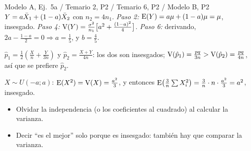 \begin{modelo}{Modelo A, Ej.\ 5a / Temario 2, P2 / Temario 6, P2 / Modelo B, P2}
$Y=a\bar{X}_1+(1-a)\bar{X}_2$ con $n_2=4n_1$. \emph{Paso 2:} $\mathrm{E}(Y)=a\mu+(1-a)\mu=\mu$, insesgado.
\emph{Paso 4:} $\mathrm{V}(Y)=\frac{\sigma^2}{n_1}\big[a^2+\frac{(1-a)^2}{4}\big]$.
\emph{Paso 6:} derivando, $2a-\frac{1-a}{2}=0\Rightarrow a=\frac15$, y $b=\frac45$.

$\hat p_1=\frac12(\frac Xn+\frac Y{3n})$ y $\hat p_2=\frac{X+Y}{4n}$: los dos son insesgados; $\mathrm{V}(\hat p_1)=\frac{pq}{3n}>\mathrm{V}(\hat p_2)=\frac{pq}{4n}$, así que se prefiere $\hat p_2$.

$X\sim U(-a;a)$: $\mathrm{E}(X^2)=\mathrm{V}(X)=\frac{a^2}3$, y entonces $\mathrm{E}\big(\frac3n\sum X_i^2\big)=\frac3n\cdot n\cdot\frac{a^2}{3}=a^2$, insesgado.
\end{modelo}
\begin{ojo}
\begin{itemize}
\item Olvidar la independencia (o los coeficientes al cuadrado) al calcular la varianza.
\item Decir ``es el mejor'' solo porque es insesgado: también hay que comparar la varianza.
\end{itemize}
\end{ojo}

